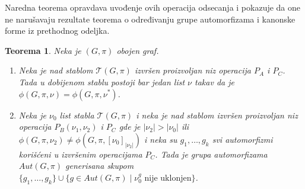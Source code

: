 \documentclass[12pt,oneside]{memoir}
\newtheorem{theorem}{Teorema}
\theoremstyle{definition}
\begin{document}
  Naredna teorema opravdava uvođenje ovih operacija odsecanja i pokazuje da one
  ne narušavaju rezultate teorema o određivanju grupe automorfizama i kanonske
  forme iz prethodnog odeljka.

  \begin{theorem}
	  Neka je $(G, \pi)$ obojen graf.
	  \begin{enumerate}
		  \item Neka je nad stablom $\mathcal{T}(G, \pi)$ izvršen proizvoljan
			  niz operacija $P_A$ i $P_C$. Tada u dobijenom stablu postoji bar
			  jedan list $\nu$ takav da je $\phi(G, \pi, \nu) = \phi(G, \pi,
			  \nu^*)$.
		  \item Neka je $\nu_0$ list stabla $\mathcal{T}(G, \pi)$ i neka je nad
			  stablom izvršen proizvoljan niz operacija $P_B(\nu_1, \nu_2)$ i
			  $P_C$ gde je $|\nu_2| > |\nu_0|$ ili $\phi(G, \pi, \nu_2) \neq
			  \phi(G, \pi, [\nu_0]_{|\nu_2|})$ i neka su $g_1, \dots, g_k$ svi
			  automorfizmi korišćeni u izvršenim operacijama $P_C$.  Tada je
			  grupa automorfizama $Aut(G, \pi)$ generisana skupom $\{g_1,
			  \dots, g_k\} \cup \{g \in Aut(G, \pi) \mid \nu_0^g \text{ nije
			  uklonjen}\}$.
	  \end{enumerate}
  \end{theorem}
\end{document}

